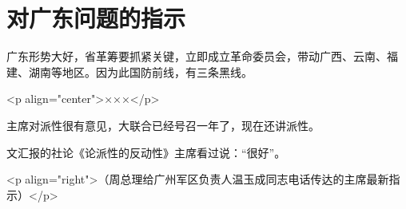 \section[对广东问题的指示（一九六八年二月）]{对广东问题的指示}


广东形势大好，省革筹要抓紧关键，立即成立革命委员会，带动广西、云南、福建、湖南等地区。因为此国防前线，有三条黑线。

<p align="center">×××</p>

主席对派性很有意见，大联合已经号召一年了，现在还讲派性。

文汇报的社论《论派性的反动性》主席看过说：“很好”。

<p align="right">（周总理给广州军区负责人温玉成同志电话传达的主席最新指示）</p>


